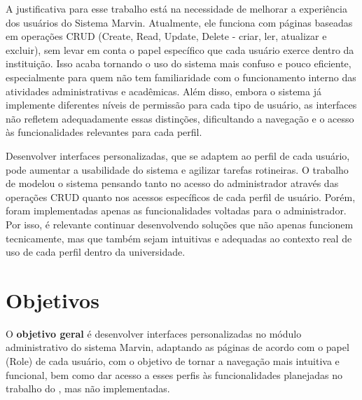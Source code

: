 A justificativa para esse trabalho está na necessidade de melhorar a experiência dos usuários do Sistema Marvin. Atualmente, ele funciona com páginas baseadas em operações CRUD (Create, Read, Update, Delete - criar, ler, atualizar e excluir), sem levar em conta o papel específico que cada usuário exerce dentro da instituição. Isso acaba tornando o uso do sistema mais confuso e pouco eficiente, especialmente para quem não tem familiaridade com o funcionamento interno das atividades administrativas e acadêmicas. Além disso, embora o sistema já implemente diferentes níveis de permissão para cada tipo de usuário, as interfaces não refletem adequadamente essas distinções, dificultando a navegação e o acesso às funcionalidades relevantes para cada perfil.

Desenvolver interfaces personalizadas, que se adaptem ao perfil de cada usuário, pode aumentar a usabilidade do sistema e agilizar tarefas rotineiras. O trabalho de \cite{requisitos_marvin_core} modelou o sistema pensando tanto no acesso do administrador através das operações CRUD quanto nos acessos específicos de cada perfil de usuário. Porém, foram implementadas apenas as funcionalidades voltadas para o administrador. Por isso, é relevante continuar desenvolvendo soluções que não apenas funcionem tecnicamente, mas que também sejam intuitivas e adequadas ao contexto real de uso de cada perfil dentro da universidade.

\section{Objetivos}
\label{sec-intro-obj}



O \textbf{objetivo geral} é desenvolver interfaces personalizadas no módulo administrativo do sistema Marvin, adaptando as páginas de acordo com o papel (Role) de cada usuário, com o objetivo de tornar a navegação mais intuitiva e funcional, bem como dar acesso a esses perfis às funcionalidades planejadas no trabalho do \cite{requisitos_marvin_core}, mas não implementadas.

